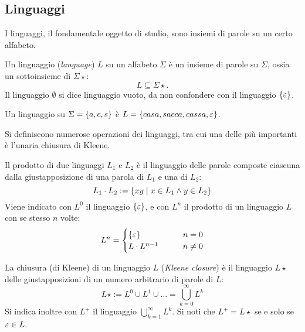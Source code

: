 \subsection*{Linguaggi}
I linguaggi, il fondamentale oggetto di studio, sono insiemi di parole su un certo alfabeto.
\begin{defin}[linguaggio]
	Un linguaggio (\emph{language}) $L$ su un alfabeto $\Sigma$ è un insieme di parole su $\Sigma$, ossia un sottoinsieme di $\Sigma\star$:
	\begin{equation*}
		L\subseteq\Sigma\star.
	\end{equation*}
	Il linguaggio $\emptyset$ si dice linguaggio vuoto, da non confondere con il linguaggio $\left\{ \varepsilon \right\}$.
\end{defin}
\begin{examp}
	Un linguaggio su $\Sigma=\left\{ a,c,s \right\}$ è $L=\left\{ casa, sacca, cassa, \varepsilon \right\}$.
\end{examp}
Si definiscono numerose operazioni dei linguaggi, tra cui una delle più importanti è l'unaria chiusura di Kleene.
\begin{defin}
	Il prodotto di due linguaggi $L_1$ e $L_2$ è il linguaggio delle parole composte ciascuna dalla giustapposizione di una parola di $L_1$ e una di $L_2$:
	\begin{equation*}
		L_1\cdot L_2 := \left\{ xy\mid x\in L_1 \land y\in L_2 \right\}
	\end{equation*}
	Viene indicato con $L^0$ il linguaggio $\left\{ \varepsilon \right\}$, e con $L^n$ il prodotto di un linguaggio $L$ con se stesso $n$ volte:
	\begin{equation*}
		L^n=\begin{cases}
			\left\{ \varepsilon \right\} \qquad & n=0    \\
			L\cdot L^{n-1}\qquad    & n\neq0
		\end{cases}
	\end{equation*}
\end{defin}
\begin{defin}
	La chiusura (di Kleene) di un linguaggio $L$ (\emph{Kleene closure}) è il linguaggio $L\star$ delle giustapposizioni di un numero arbitrario di parole di $L$:
	\begin{equation*}
		L\star := L^0\cup L^1\cup\dots=\bigcup_{k=0}^\infty L^k
	\end{equation*}
	Si indica inoltre con $L^+$ il linguaggio $\bigcup_{k=1}^\infty L^k$. Si noti che $L^+=L\star$ se e solo se $\varepsilon\in L$.
\end{defin}

